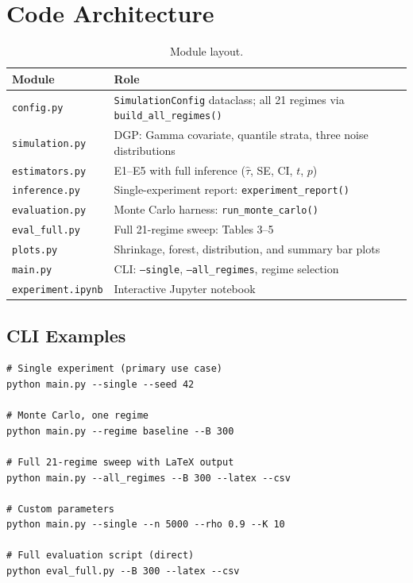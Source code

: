\documentclass[11pt,letterpaper]{article}
\newcommand{\tauhat}{\hat{\tau}}
\begin{document}
\section{Code Architecture}\label{sec:code}

\begin{table}[htbp]
\centering\small
\caption{Module layout.}
\begin{tabular}{@{}ll@{}}
\toprule
Module & Role \\
\midrule
\texttt{config.py}       & \texttt{SimulationConfig} dataclass; all 21 regimes via \texttt{build\_all\_regimes()} \\
\texttt{simulation.py}   & DGP: Gamma covariate, quantile strata, three noise distributions \\
\texttt{estimators.py}   & E1--E5 with full inference ($\tauhat$, SE, CI, $t$, $p$) \\
\texttt{inference.py}    & Single-experiment report: \texttt{experiment\_report()} \\
\texttt{evaluation.py}   & Monte Carlo harness: \texttt{run\_monte\_carlo()} \\
\texttt{eval\_full.py}   & Full 21-regime sweep: Tables 3--5 \\
\texttt{plots.py}        & Shrinkage, forest, distribution, and summary bar plots \\
\texttt{main.py}         & CLI: \texttt{--single}, \texttt{--all\_regimes}, regime selection \\
\texttt{experiment.ipynb} & Interactive Jupyter notebook \\
\bottomrule
\end{tabular}
\end{table}

\subsection{CLI Examples}

\begin{verbatim}
# Single experiment (primary use case)
python main.py --single --seed 42

# Monte Carlo, one regime
python main.py --regime baseline --B 300

# Full 21-regime sweep with LaTeX output
python main.py --all_regimes --B 300 --latex --csv

# Custom parameters
python main.py --single --n 5000 --rho 0.9 --K 10

# Full evaluation script (direct)
python eval_full.py --B 300 --latex --csv
\end{verbatim}
\end{document}
